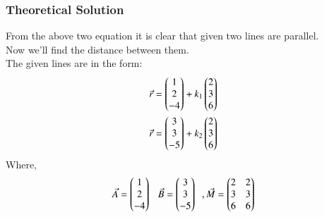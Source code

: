 \documentclass{beamer}
\begin{document}
\begin{frame}
\frametitle{Theoretical Solution}
From the above two equation it is clear that given two lines are parallel.\\
Now we'll find the distance between them.\\
The given lines are in the form:
\begin{align}
   \Vec{r} = \begin{pmatrix}1\\2\\-4\end{pmatrix} + k_1\begin{pmatrix}2\\3\\6\end{pmatrix}\\
   \Vec{r} = \begin{pmatrix}3\\3\\-5\end{pmatrix}+ k_2\begin{pmatrix}2\\3\\6\end{pmatrix}
\end{align}
Where,
\begin{align}
    \Vec{A}=\begin{pmatrix}1\\2\\-4\end{pmatrix}\;\;\,\Vec{B}=\begin{pmatrix}3\\3\\-5\end{pmatrix}\;\;,\Vec{M}=\begin{pmatrix}2&2\\3&3\\6&6\end{pmatrix}
\end{align}


\end{frame}
\end{document}
